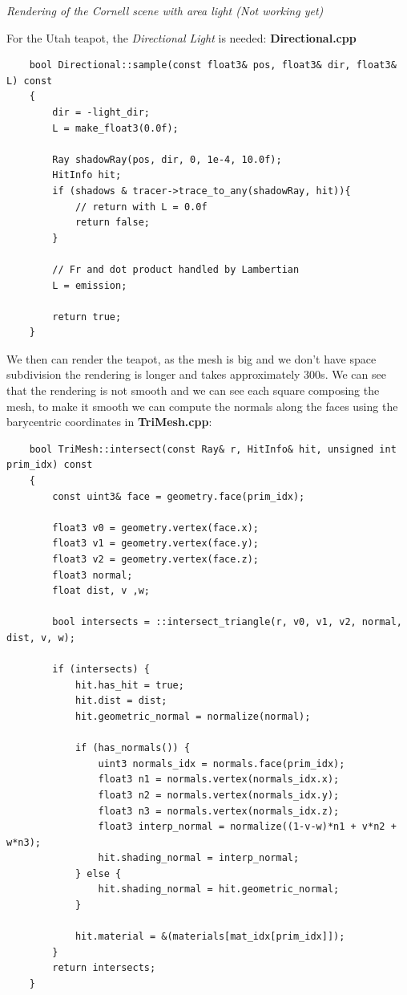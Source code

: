 \documentclass[a4,12pt]{article}
\begin{document}
\begin{center}
\begin{minipage}[b]{0.40\linewidth}
\begin{center}
				\textit{Rendering of the Cornell scene with area light (Not working yet)}
			\end{center}
		\end{minipage}
	\end{center}
	
	For the Utah teapot, the \textit{Directional Light} is needed:
	\textbf{Directional.cpp}
	
	\begin{lstlisting}
	bool Directional::sample(const float3& pos, float3& dir, float3& L) const
	{
		dir = -light_dir;
		L = make_float3(0.0f);
		
		Ray shadowRay(pos, dir, 0, 1e-4, 10.0f);
		HitInfo hit;
		if (shadows & tracer->trace_to_any(shadowRay, hit)){
			// return with L = 0.0f
			return false;
		}
		
		// Fr and dot product handled by Lambertian
		L = emission;
		
		return true;
	}
	\end{lstlisting}
	
	We then can render the teapot, as the mesh is big and we don't have space subdivision the rendering is longer and takes approximately 300s. We can see that the rendering is not smooth and we can see each square composing the mesh, to make it smooth we can compute the normals along the faces using the barycentric coordinates in \textbf{TriMesh.cpp}:
	
	\begin{lstlisting}
	bool TriMesh::intersect(const Ray& r, HitInfo& hit, unsigned int prim_idx) const
	{
		const uint3& face = geometry.face(prim_idx);
		
		float3 v0 = geometry.vertex(face.x);
		float3 v1 = geometry.vertex(face.y);
		float3 v2 = geometry.vertex(face.z);
		float3 normal;
		float dist, v ,w;
		
		bool intersects = ::intersect_triangle(r, v0, v1, v2, normal, dist, v, w);
		
		if (intersects) {
			hit.has_hit = true;
			hit.dist = dist;
			hit.geometric_normal = normalize(normal);
			
			if (has_normals()) {
				uint3 normals_idx = normals.face(prim_idx);
				float3 n1 = normals.vertex(normals_idx.x);
				float3 n2 = normals.vertex(normals_idx.y);
				float3 n3 = normals.vertex(normals_idx.z);
				float3 interp_normal = normalize((1-v-w)*n1 + v*n2 + w*n3);
				hit.shading_normal = interp_normal;
			} else {
				hit.shading_normal = hit.geometric_normal;
			}
			
			hit.material = &(materials[mat_idx[prim_idx]]);
		}
		return intersects;
	}
	\end{lstlisting}
	
\end{document}
